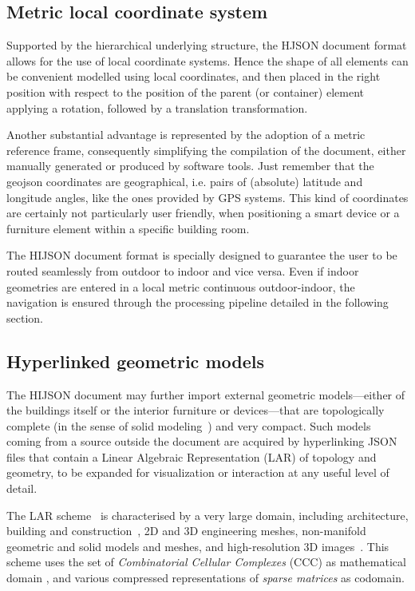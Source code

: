 \subsection{Metric local coordinate system}\label{metric-local-coordinate-system}

Supported by the hierarchical underlying structure, the HJSON document format allows 
for the use of local coordinate systems. Hence the shape of all elements can 
be convenient modelled using local coordinates, and then placed in the right position 
with respect to the position of the parent (or container) element applying a rotation, followed by a
translation transformation.

Another substantial advantage is represented by the adoption of a metric reference frame, 
consequently simplifying the compilation of the document, either manually generated or produced by software tools.
Just remember that the geojson coordinates are geographical, i.e. pairs of (absolute) latitude and longitude angles, like the ones provided by GPS systems. This kind of coordinates  are certainly not particularly user friendly, when positioning a smart device or a furniture element within a specific building room.

The HIJSON document format is specially designed to guarantee the user to be routed seamlessly 
from outdoor to indoor and vice versa. Even if indoor geometries are entered in a local metric 
 continuous outdoor-indoor, the navigation is ensured through the processing pipeline
detailed in the following section.

\subsection{Hyperlinked geometric models}\label{optional-lar}

The HIJSON document may further import external geometric models---either of the buildings itself or the interior furniture or devices---that are topologically complete (in the sense of solid modeling~\cite{Requicha:1980:RRS:356827.356833}) and very compact. 
Such models coming from a source outside the document are acquired by hyperlinking JSON files that contain a Linear Algebraic Representation (LAR) of topology and geometry, to be expanded for visualization or interaction at any useful level of detail. 

The LAR scheme~\cite{Dicarlo:2014:TNL:2543138.2543294} is characterised by a very large domain, including architecture, building and construction~\cite{paoluzziMS:2014}, 2D and 3D engineering meshes, non-manifold geometric and solid models and meshes, and high-resolution 3D images~\cite{cadanda:2015}. This scheme uses the set of \emph{Combinatorial Cellular Complexes} (CCC) as mathematical domain
\cite{Basak:2010}, and various compressed representations of \emph{sparse matrices} \cite{gemmexp} as codomain. 

